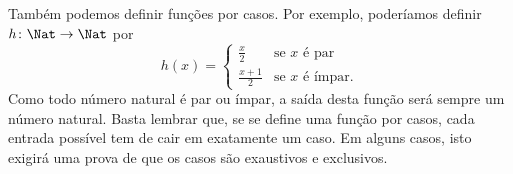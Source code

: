 \documentclass[../../../include/open-logic-section]{subfiles}
\begin{document}
\begin{ex}
Também podemos definir funções por casos. Por exemplo, poderíamos definir
$h \colon \Nat \to \Nat$ por
\[
h(x) =
\begin{cases}
  \frac{x}{2} & \text{se $x$ é par} \\
  \frac{x+1}{2} & \text{se $x$ é ímpar.}
\end{cases}
\]
Como todo número natural é par ou ímpar, a saída desta
função será sempre um número natural. Basta lembrar que, se se
define uma função por casos, cada entrada possível tem de cair em
exatamente um caso. Em alguns casos, isto exigirá uma prova de que os
casos são exaustivos e exclusivos.
\end{ex}
\end{document}
